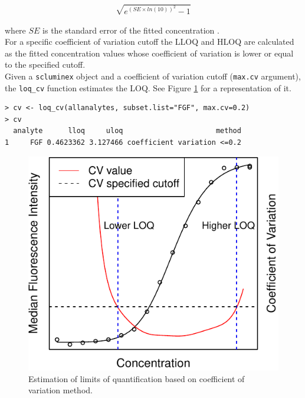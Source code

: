 \documentclass[11pt]{article}\usepackage[]{graphicx}\usepackage[]{color}
\makeatletter
\def\maxwidth{ %
  \ifdim\Gin@nat@width>\linewidth
    \linewidth
  \else
    \Gin@nat@width
  \fi
}
\newenvironment{kframe}{%
 \def\at@end@of@kframe{}%
 \ifinner\ifhmode%
  \def\at@end@of@kframe{\end{minipage}}%
  \begin{minipage}{\columnwidth}%
 \fi\fi%
 \def\FrameCommand##1{\hskip\@totalleftmargin \hskip-\fboxsep
 \colorbox{shadecolor}{##1}\hskip-\fboxsep
     \hskip-\linewidth \hskip-\@totalleftmargin \hskip\columnwidth}%
 \MakeFramed {\advance\hsize-\width
   \@totalleftmargin\z@ \linewidth\hsize
   \@setminipage}}%
 {\par\unskip\endMakeFramed%
 \at@end@of@kframe}
\newenvironment{knitrout}{}{} %
\makeatother
\begin{document}
\begin{align*}
\sqrt{e^{ (SE \times  ln(10))^2} - 1 }
\end{align*}

\noindent where $SE$ is the standard error of the fitted 
concentration \cite{logcv}. \\

\noindent For a specific coefficient of variation cutoff the LLOQ and HLOQ are calculated as the fitted concentration values whose coefficient of variation is lower or equal to the specified cutoff. \\

\noindent Given a {\tt scluminex} object and a coefficient of variation cutoff 
({\tt max.cv} argument), the {\tt loq\_cv} function estimates the LOQ. See
Figure \ref{fig:loqcv} for a representation of it.


\begin{knitrout}
\color{fgcolor}\begin{kframe}
\begin{verbatim}
> cv <- loq_cv(allanalytes, subset.list="FGF", max.cv=0.2)
> cv
  analyte      lloq     uloq                      method
1     FGF 0.4623362 3.127466 coefficient variation <=0.2
\end{verbatim}
\end{kframe}
\end{knitrout}




\begin{knitrout}
\color{fgcolor}\begin{figure}

{\centering \includegraphics[width=\maxwidth]{./loqcv-1} 

}

\caption[Estimation of limits of quantification based on coefficient of variation method]{Estimation of limits of quantification based on coefficient of variation method.}\label{fig:loqcv}
\end{figure}


\end{knitrout}
\end{document}
